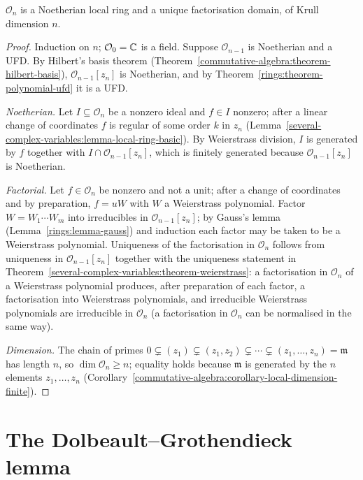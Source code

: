 \begin{theorem}\label{several-complex-variables:theorem-local-ring}
$\mathcal{O}_n$ is a Noetherian local ring and a unique factorisation domain, of Krull dimension $n$.
\end{theorem}

\begin{proof}
Induction on $n$; $\mathcal{O}_0 = \mathbb{C}$ is a field. Suppose $\mathcal{O}_{n-1}$ is Noetherian and a UFD. By Hilbert's basis theorem (Theorem~\ref{commutative-algebra:theorem-hilbert-basis}),
$\mathcal{O}_{n-1}[z_n]$ is Noetherian, and by Theorem~\ref{rings:theorem-polynomial-ufd} it is a UFD.

\emph{Noetherian.} Let $I \subseteq \mathcal{O}_n$ be a nonzero ideal and $f \in I$ nonzero; after a linear change of coordinates $f$ is regular of some order $k$ in $z_n$
(Lemma~\ref{several-complex-variables:lemma-local-ring-basic}). By Weierstrass division, $I$ is generated by $f$ together with $I \cap \mathcal{O}_{n-1}[z_n]$, which is finitely generated because
$\mathcal{O}_{n-1}[z_n]$ is Noetherian.

\emph{Factorial.} Let $f \in \mathcal{O}_n$ be nonzero and not a unit; after a change of coordinates and by preparation, $f = uW$ with $W$ a Weierstrass polynomial. Factor $W = W_1 \cdots W_m$ into
irreducibles in $\mathcal{O}_{n-1}[z_n]$; by Gauss's lemma (Lemma~\ref{rings:lemma-gauss}) and induction each factor may be taken to be a Weierstrass polynomial. Uniqueness of the factorisation in
$\mathcal{O}_n$ follows from uniqueness in $\mathcal{O}_{n-1}[z_n]$ together with the uniqueness statement in Theorem~\ref{several-complex-variables:theorem-weierstrass}: a factorisation in
$\mathcal{O}_n$ of a Weierstrass polynomial produces, after preparation of each factor, a factorisation into Weierstrass polynomials, and irreducible Weierstrass polynomials are irreducible in
$\mathcal{O}_n$ (a factorisation in $\mathcal{O}_n$ can be normalised in the same way).

\emph{Dimension.} The chain of primes $0 \subsetneq (z_1) \subsetneq (z_1, z_2) \subsetneq \cdots \subsetneq (z_1, \ldots, z_n) = \mathfrak{m}$ has length $n$, so $\dim\mathcal{O}_n \geq n$; equality holds because
$\mathfrak{m}$ is generated by the $n$ elements $z_1, \ldots, z_n$ (Corollary~\ref{commutative-algebra:corollary-local-dimension-finite}).
\end{proof}

\section{The Dolbeault--Grothendieck lemma}\label{several-complex-variables:section-dbar}

